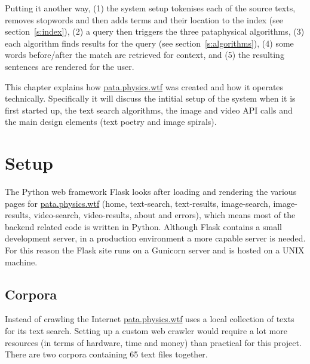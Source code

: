   

Putting it another way, (1) the system setup tokenises each of the source texts, removes stopwords and then adds terms and their location to the index (see section~\ref{s:index}), (2) a query then triggers the three pataphysical algorithms, (3) each algorithm finds results for the query (see section~\ref{s:algorithms}), (4) some words before/after the match are retrieved for context, and (5) the resulting sentences are rendered for the user.

\spirals

This chapter explains how \url{pata.physics.wtf} was created and how it operates technically. Specifically it will discuss the intitial setup of the system when it is first started up, the text search algorithms, the image and video \ac{API} calls and the main design elements (text poetry and image spirals).


\section{Setup}

The Python web framework Flask \autocite{Ronacher2016} looks after loading and rendering the various pages for \url{pata.physics.wtf} (home, text-search, text-results, image-search, image-results, video-search, video-results, about and errors), which means most of the backend related code is written in Python. Although Flask contains a small development server, in a production environment a more capable server is needed. For this reason the Flask site runs on a Gunicorn server \autocite{Gunicorn2016} and is hosted on a UNIX machine.


\subsection{Corpora}
\label{s:corpora}

Instead of crawling the Internet \url{pata.physics.wtf} uses a local collection of texts for its text search. Setting up a custom web crawler would require a lot more resources (in terms of hardware, time and money) than practical for this project. There are two corpora containing \num{65} text files together. 


